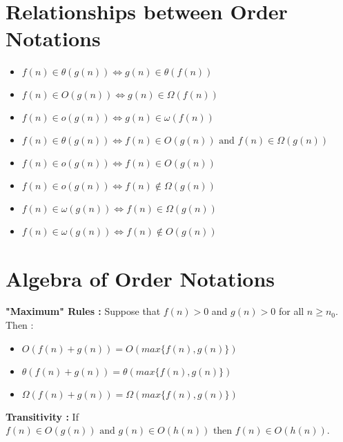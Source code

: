 \documentclass{article}
\begin{document}
\section{Relationships between Order Notations}
\begin{itemize}
\item \(f(n) \in \theta(g(n)) \iff g(n) \in \theta(f(n))\)
\item \(f(n) \in  O(g(n)) \iff g(n) \in \Omega(f(n))\)
\item \(f(n) \in o(g(n)) \iff g(n) \in \omega(f(n))\)
\end{itemize}

\begin{itemize}
\item \(f(n) \in \theta(g(n)) \iff f(n) \in O(g(n)) \text{ and } f(n) \in \Omega(g(n))\)
\item \(f(n) \in o(g(n)) \iff f(n) \in O(g(n)) \)
\item \(f(n) \in o(g(n)) \iff f(n) \notin \Omega(g(n)) \)
\item \(f(n) \in \omega(g(n)) \iff f(n) \in \Omega(g(n)) \)
\item \(f(n) \in \omega(g(n)) \iff f(n) \notin O(g(n)) \)\\
\end{itemize}

\section{Algebra of Order Notations}
\textbf{"Maximum" Rules : } Suppose that \(f(n) > 0 \) and \(g(n) > 0 \) for all \(n \geq n_0\). Then : 
\begin{itemize}
\item \(O(f(n) + g(n)) = O(max\{f(n), g(n)\})\)
\item \(\theta(f(n) + g(n)) = \theta(max\{f(n), g(n)\})\)
\item \(\Omega(f(n) + g(n)) = \Omega(max\{f(n), g(n)\})\)
\end{itemize}

\textbf{Transitivity : } If \(f(n) \in O(g(n)) \text{ and } g(n) \in O(h(n))  \text{ then } f(n) \in O(h(n))\).
\end{document}
